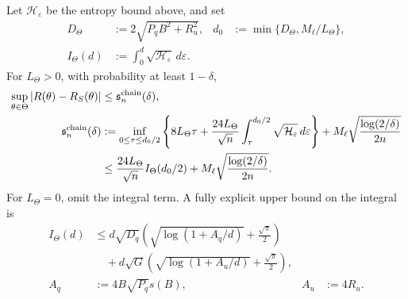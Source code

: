 \begin{theorem}
\label{thm:sharp-dudley-generalization}
Let $\mathcal H_\varepsilon$ be the entropy bound above, and set
\begin{align}
 D_\Theta&:=2\sqrt{P_qB^2+R_u^2},&
 d_0&:=\min\{D_\Theta,M_\ell/L_\Theta\},\\
 I_\Theta(d)&:=\int_0^d\sqrt{\mathcal H_\varepsilon}\,d\varepsilon.
\end{align}
For $L_\Theta>0$, with probability at least $1-\delta$,
\begin{align}\label{eq:sharp-dudley-bound}
 \sup_{\theta\in\Theta}|R(\theta)-R_S(\theta)|
 &\le\mathfrak s_n^{\rm chain}(\delta),\\
 \mathfrak s_n^{\rm chain}(\delta)
 &:=\inf_{0\le\tau\le d_0/2}\left\{8L_\Theta\tau+
 \frac{24L_\Theta}{\sqrt n}\int_\tau^{d_0/2}\sqrt{\mathcal H_\varepsilon}\,d\varepsilon\right\}
 +M_\ell\sqrt{\frac{\log(2/\delta)}{2n}}\\
 &\le\frac{24L_\Theta}{\sqrt n}I_\Theta(d_0/2)
 +M_\ell\sqrt{\frac{\log(2/\delta)}{2n}}
 .
\end{align}
For $L_\Theta=0$, omit the integral term.
A fully explicit upper bound on the integral is
\begin{align}
 I_\Theta(d)
 &\le d\sqrt{D_q}\left(\sqrt{\log(1+A_q/d)}+\frac{\sqrt\pi}{2}\right)\\
 &\quad+d\sqrt G\left(\sqrt{\log(1+A_u/d)}+\frac{\sqrt\pi}{2}\right),\\
 A_q&:=4B\sqrt{P_q}s(B),&A_u&:=4R_u.
\end{align}
\end{theorem}
